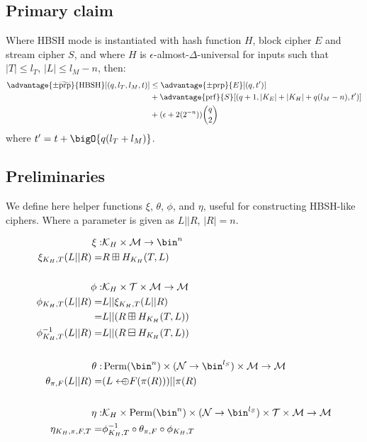 \documentclass[eprint.tex]{subfiles}
\begin{document}
\subsection{Primary claim}
\begin{theorem}\label{hbshadvantage}
    Where HBSH mode is instantiated with hash function $H$, block cipher $E$ and stream cipher $S$,
    and where $H$ is $\epsilon$-almost-$\Delta$-universal for inputs such that
    $|T| \leq l_T$, $|L| \leq l_M - n$, then:
    \begin{align*}
        \advantage{\pm \widetilde{\mathrm{prp}}}{\HBSH}[(q, l_T, l_M, t)]
        &\leq \advantage{\pm \mathrm{prp}}{E}[(q, t')] \\
        &+ \advantage{\mathrm{prf}}{S}[(q + 1, |K_E| + |K_H| + q(l_M - n), t')] \\
        &+ (\epsilon + 2(2^{-n}))\binom{q}{2} \\
    \end{align*}
    where $t' = t + \bigO{q(l_T + l_M)}$.
\end{theorem}

\subsection{Preliminaries}
We define here
helper functions $\xi$, $\theta$, $\phi$, and $\eta$, useful for constructing
HBSH-like ciphers. Where a parameter is given as
$L || R$, $|R|=n$.

\begin{align*}
    \xi :& \mathcal{K}_H \times \mathcal{M} \rightarrow \bin^n \\
    \xi_{K_H, T}(L||R) =& R \boxplus H_{K_H}(T, L) \\
    \vphantom{|} \\
    \phi :& \mathcal{K}_H \times \mathcal{T} \times \mathcal{M} \rightarrow \mathcal{M} \\
    \phi_{K_H, T}(L || R) =& L || \xi_{K_H, T}(L||R) \\
    =& L || (R \boxplus H_{K_H}(T, L)) \\
    \phi^{-1}_{K_H, T}(L || R) =& L || (R \boxminus H_{K_H}(T, L)) \\
    \vphantom{|} \\
    \theta :& \Perm(\bin^n) \times (\mathcal{N} \rightarrow \bin^{l_S}) \times \mathcal{M} \rightarrow \mathcal{M} \\
    \theta_{\pi, F}(L || R) =& (L \arrowoplus F(\pi(R))) || \pi(R) \\
    \vphantom{|} \\
    \eta :& \mathcal{K}_H \times \Perm(\bin^n) \times (\mathcal{N} \rightarrow \bin^{l_S}) \times \mathcal{T} \times \mathcal{M} \rightarrow \mathcal{M} \\
    \eta_{K_H, \pi, F, T} =& \phi_{K_H,T}^{-1} \circ \theta_{\pi, F} \circ \phi_{K_H,T} \\
\end{align*}
\end{document}
